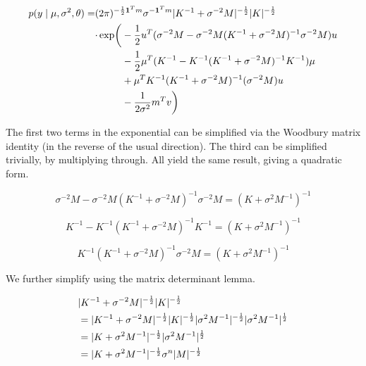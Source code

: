 \documentclass{article}
\newcommand{\one}{\mathbf{1}}
\DeclarePairedDelimiter{\Det}{\lvert}{\rvert}
\begin{document}
\begin{equation}
    \begin{aligned}
        p(y \mid \mu, \sigma^2, \theta)
        = &
        (2 \pi)^{-\frac{1}{2} \one^T m}
        \sigma^{-\one^T m}
        \Det{K^{-1} + \sigma^{-2} M}^{-\frac{1}{2}}
        \Det{K}^{-\frac{1}{2}}
        \\ &
        \begin{aligned}
            \cdot \exp \biggl(
                &
                - \frac{1}{2} u^T (\sigma^{-2} M - \sigma^{-2} M (K^{-1} + \sigma^{-2} M)^{-1} \sigma^{-2} M) u
                \\ &
                - \frac{1}{2} \mu^T (K^{-1} - K^{-1} (K^{-1} + \sigma^{-2} M)^{-1} K^{-1}) \mu
                \\ &
                + \mu^T K^{-1} (K^{-1} + \sigma^{-2} M)^{-1} (\sigma^{-2} M) u
                \\ &
                - \frac{1}{2\sigma^2} m^T v
            \biggr)
        \end{aligned}
    \end{aligned}
\end{equation}

The first two terms in the exponential can be simplified via the Woodbury matrix identity (in the reverse of the usual direction).
The third can be simplified trivially, by multiplying through.
All yield the same result, giving a quadratic form.

\begin{equation}
    \sigma^{-2} M - \sigma^{-2} M (K^{-1} + \sigma^{-2} M)^{-1} \sigma^{-2} M = (K + \sigma^2 M^{-1})^{-1}
\end{equation}

\begin{equation}
    K^{-1} - K^{-1} (K^{-1} + \sigma^{-2} M)^{-1} K^{-1} = (K + \sigma^2 M^{-1})^{-1}
\end{equation}

\begin{equation}
    K^{-1} (K^{-1} + \sigma^{-2} M)^{-1} \sigma^{-2} M = (K + \sigma^2 M^{-1})^{-1}
\end{equation}

We further simplify using the matrix determinant lemma.

\begin{align}
    & 
    \Det{K^{-1} + \sigma^{-2} M}^{-\frac{1}{2}} \Det{K}^{-\frac{1}{2}}
    \notag \\ & =
    \Det{K^{-1} + \sigma^{-2} M}^{-\frac{1}{2}} \Det{K}^{-\frac{1}{2}}
    \Det{\sigma^2 M^{-1}}^{-\frac{1}{2}} \Det{\sigma^2 M^{-1}}^{\frac{1}{2}}
    \\ &=
    \Det{K + \sigma^2 M^{-1}}^{-\frac{1}{2}}
    \Det{\sigma^2 M^{-1}}^{\frac{1}{2}}
    \\ &=
    \Det{K + \sigma^2 M^{-1}}^{-\frac{1}{2}}
    \sigma^n
    \Det{M}^{-\frac{1}{2}}
\end{align}
\end{document}

